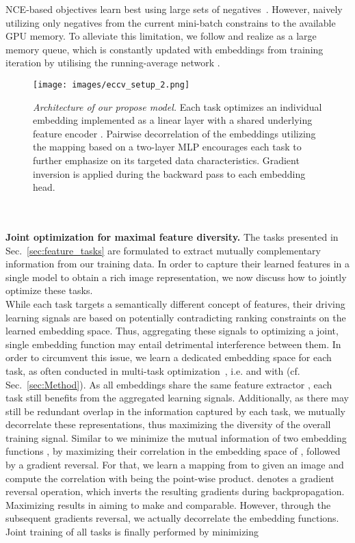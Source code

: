 \documentclass[runningheads]{llncs}
\begin{document}
\noindent
NCE-based objectives learn best using large sets of negatives~\cite{moco}. However, naively utilizing only negatives from the current mini-batch constrains  to the available GPU memory. To alleviate this limitation, we follow \cite{moco} and realize  as a large memory queue, which is constantly updated with embeddings  from training iteration  by utilising the running-average network .
\begin{figure}[t]
    \centering
    \texttt{[image: images/eccv\_setup\_2.png]}
    \caption{\textit{Architecture of our propose model.} Each task  optimizes an individual embedding  implemented as a linear layer with a shared underlying feature encoder . Pairwise decorrelation  of the embeddings utilizing the mapping  based on a two-layer MLP encourages each task to further emphasize on its targeted data characteristics. Gradient inversion  is applied during the backward pass to each embedding head. 
}
    \label{fig:setup}
\end{figure} \\
\\
\textbf{Joint optimization for maximal feature diversity.}
The tasks presented in Sec.~\ref{sec:feature_tasks} are formulated to extract mutually complementary information from our training data. In order to capture their learned features in a single model to obtain a rich image representation, we now discuss how to jointly optimize these tasks. 
\\
While each task targets a semantically different concept of features, their driving learning signals are based on potentially contradicting ranking constraints on the learned embedding space. Thus, aggregating these signals to optimizing a joint, single embedding function  may entail detrimental interference between them. In order to circumvent this issue, we learn a dedicated embedding space for each task, as often conducted in multi-task optimization~\cite{mic,fasterrcnn}, i.e.   and  with  (cf. Sec.~\ref{sec:Method}).
As all embeddings share the same feature extractor , each task still benefits from the aggregated learning signals. Additionally, as there may still be redundant overlap in the information captured by each task, we mutually decorrelate these representations, thus maximizing the diversity of the overall training signal. Similar to \cite{abier,mic} we minimize the mutual information of two embedding functions ,  by maximizing their correlation  in the embedding space of , followed by a gradient reversal. For that, we learn a mapping  from  to  given an image  and compute the correlation  with  being the point-wise product.  denotes a gradient reversal operation, which inverts the resulting gradients during backpropagation. Maximizing  results in  aiming to make  and  comparable. However, through the subsequent gradients reversal, we actually decorrelate the embedding functions. Joint training of all tasks is finally performed by minimizing
\end{document}
